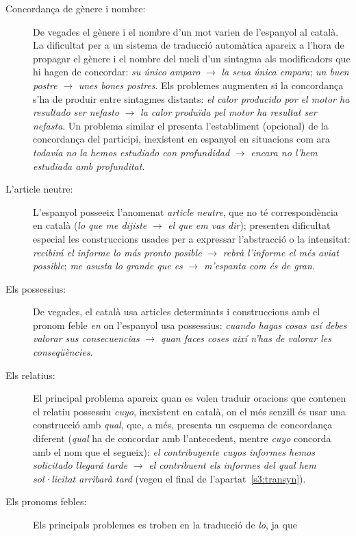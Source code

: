 \begin{description}
\item[Concordança de gènere i nombre:] De vegades el gènere i el
  nombre d'un mot varien de l'espanyol al català. La dificultat per a
  un sistema de traducció automàtica apareix a l'hora de propagar el
  gènere i el nombre del nucli d'un sintagma als modificadors que hi
  hagen de concordar: \emph{su único amparo} $\rightarrow$ \emph{la
    seua única empara}; \emph{un buen postre} $\rightarrow$ \emph{unes
    bones postres}. Els problemes augmenten si la concordança s'ha
  de produir entre sintagmes distants: \emph{el calor producido por el
    motor ha resultado ser nefasto} $\rightarrow$ \emph{la calor
    produïda pel motor ha resultat ser nefasta}. Un problema similar
  el presenta l'establiment (opcional) de la concordança del
  participi, inexistent en espanyol en situacions com ara
  \emph{todavía no la hemos estudiado con profundidad} $\rightarrow$
  \emph{encara no l'hem estudiada amb profunditat}.
\item[L'article neutre:] L'espanyol posseeix l'anomenat {\em
    article neutre}, que no té correspondència en  català
  (\emph{lo que me dijiste} $\rightarrow$ \emph{el que em vas dir});
  presenten dificultat especial les construccions usades per a
  expressar l'abstracció o la intensitat: 
  \emph{recibirá el informe lo más pronto posible}
  $\rightarrow$ \emph{rebrà l'informe el més aviat possible};
  \emph{me asusta lo grande que es} $\rightarrow$ \emph{m'espanta com
    és de gran}.
\item[Els possessius:] De vegades, el català usa articles
  determinats i construccions amb el pronom feble \emph{en} 
  on l'espanyol usa possessius: \emph{cuando hagas cosas así
    debes valorar sus consecuencias} $\rightarrow$ \emph{quan
    faces coses així n'has de valorar les
    conseqüències}. 
\item[Els relatius:]
El principal problema apareix quan es volen traduir oracions que
contenen 
el relatiu possessiu \emph{cuyo},
inexistent en català, on el més senzill és 
usar una construcció amb {\em
  qual}, que, a més, presenta un esquema de concordança
diferent (\emph{qual} ha de concordar amb l'antecedent, mentre {\em
  cuyo} concorda amb el nom que el segueix):
\emph{el contribuyente cuyos informes hemos solicitado llegará tarde} 
$\rightarrow$ \emph{el contribuent els informes del qual hem
  sol·licitat 
arribarà tard} (vegeu el final de l'apartat~\ref{s3:transyn}).
\item[Els pronoms febles:]
Els principals problemes es troben en la traducció de \emph{lo}, ja que

\end{description}
